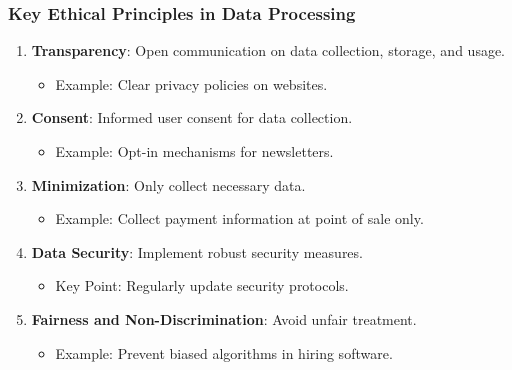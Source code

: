 \documentclass{beamer}
\begin{document}
\begin{frame}[fragile]
    \frametitle{Key Ethical Principles in Data Processing}
    \begin{enumerate}
        \item \textbf{Transparency}: Open communication on data collection, storage, and usage.
            \begin{itemize}
                \item Example: Clear privacy policies on websites.
            \end{itemize}
        \item \textbf{Consent}: Informed user consent for data collection.
            \begin{itemize}
                \item Example: Opt-in mechanisms for newsletters.
            \end{itemize}
        \item \textbf{Minimization}: Only collect necessary data.
            \begin{itemize}
                \item Example: Collect payment information at point of sale only.
            \end{itemize}
        \item \textbf{Data Security}: Implement robust security measures.
            \begin{itemize}
                \item Key Point: Regularly update security protocols.
            \end{itemize}
        \item \textbf{Fairness and Non-Discrimination}: Avoid unfair treatment.
            \begin{itemize}
                \item Example: Prevent biased algorithms in hiring software.
            \end{itemize}
    \end{enumerate}
\end{frame}
\end{document}

